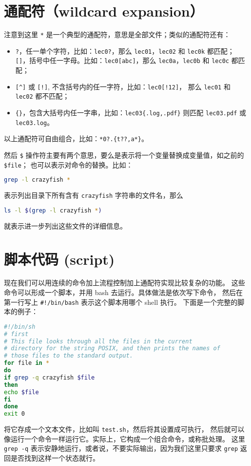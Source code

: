 \documentclass[a4paper]{ctexart}
\begin{document}
\section{通配符（wildcard expansion）}
注意到这里 \verb|*| 是一个典型的通配符，意思是全部文件；类似的通配符还有：
\begin{itemize}
\item \verb|?|，任一单个字符，比如：\verb|lec0?|，那么
  \verb|lec01|，\verb|lec02| 和 \verb|lec0k| 都匹配；
\verb|[]|，括号中任一字母。比如：\verb|lec0[abc]|，那么
\verb|lec0a|，\verb|lec0b| 和 \verb|lec0c| 都匹配；
\item \verb|[^]| 或 \verb|[!]|, 不含括号内的任一字符，比如：\verb|lec0[!12]|，
  那么 \verb|lec01| 和 \verb|lec02| 都不匹配；
\item \verb|{}|，包含大括号内任一字串，比如：\verb|lec03{.log,.pdf}| 则匹配
  \verb|lec03.pdf| 或 \verb|lec03.log|。
\end{itemize}
以上通配符可自由组合，比如：\verb|*0?.{t??,a*}|。

然后 \verb|$| 操作符主要有两个意思，要么是表示将一个变量替换成变量值，如之前的 \verb|$file|；
也可以表示对命令的替换。比如：
\begin{lstlisting}[language=sh]
grep -l crazyfish *
\end{lstlisting}
表示列出目录下所有含有 \verb|crazyfish| 字符串的文件名，那么
\begin{lstlisting}[language=sh]
ls -l $(grep -l crazyfish *)
\end{lstlisting}
就表示进一步列出这些文件的详细信息。

\section{脚本代码 (script)}

现在我们可以用连续的命令加上流程控制加上通配符实现比较复杂的功能。
这些命令可以形成一个脚本，并用 bash 去运行。具体做法是依次写下命令，
然后在第一行写上 \verb|#!/bin/bash| 表示这个脚本用哪个 shell 执行。
下面是一个完整的脚本的例子：
\begin{lstlisting}[language=sh]
#!/bin/sh
# first
# This file looks through all the files in the current
# directory for the string POSIX, and then prints the names of
# those files to the standard output.
for file in *
do
if grep -q crazyfish $file 
then
echo $file 
fi
done
exit 0
\end{lstlisting}
将它存成一个文本文件，比如叫 \verb|test.sh|，然后将其设置成可执行，
然后就可以像运行一个命令一样运行它。实际上，它构成一个组合命令，或称批处理。
这里 \verb|grep -q| 表示安静地运行，或者说，不要实际输出，因为我们这里只要求
\verb|grep| 返回是否找到这样一个状态就行。
\end{document}
